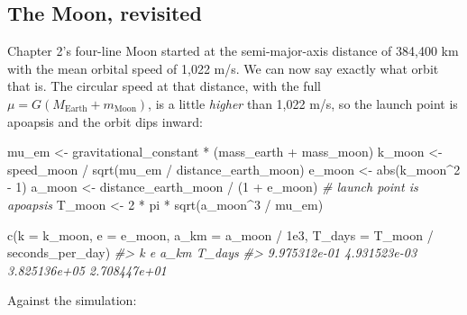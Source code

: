 \documentclass[
  10.5pt,
  letterpaper,
]{scrbook}
\newenvironment{Shaded}{\begin{snugshade}}{\end{snugshade}}
\newcommand{\AttributeTok}[1]{\textcolor[rgb]{0.00,0.00,0.00}{#1}}
\newcommand{\CommentTok}[1]{\textcolor[rgb]{0.00,0.00,0.00}{\textit{#1}}}
\newcommand{\DecValTok}[1]{\textcolor[rgb]{0.00,0.00,0.00}{#1}}
\newcommand{\FloatTok}[1]{\textcolor[rgb]{0.00,0.00,0.00}{#1}}
\newcommand{\FunctionTok}[1]{\textcolor[rgb]{0.00,0.00,0.00}{#1}}
\newcommand{\NormalTok}[1]{\textcolor[rgb]{0.00,0.00,0.00}{#1}}
\newcommand{\OtherTok}[1]{\textcolor[rgb]{0.00,0.00,0.00}{#1}}
\newcommand{\SpecialCharTok}[1]{\textcolor[rgb]{0.00,0.00,0.00}{#1}}
\theoremstyle{definition}
\theoremstyle{plain}
\theoremstyle{remark}
\begin{document}
\subsection{The Moon, revisited}\label{the-moon-revisited}

Chapter 2's four-line Moon started at the semi-major-axis distance of
384,400 km with the mean orbital speed of 1,022 m/s. We can now say
exactly what orbit that is. The circular speed at that distance, with
the full \(\mu = G(M_{\mathrm{Earth}} + m_{\mathrm{Moon}})\), is a
little \emph{higher} than 1,022 m/s, so the launch point is apoapsis and
the orbit dips inward:

\begin{Shaded}
\begin{Highlighting}[]
\NormalTok{mu\_em  }\OtherTok{\textless{}{-}}\NormalTok{ gravitational\_constant }\SpecialCharTok{*}\NormalTok{ (mass\_earth }\SpecialCharTok{+}\NormalTok{ mass\_moon)}
\NormalTok{k\_moon }\OtherTok{\textless{}{-}}\NormalTok{ speed\_moon }\SpecialCharTok{/} \FunctionTok{sqrt}\NormalTok{(mu\_em }\SpecialCharTok{/}\NormalTok{ distance\_earth\_moon)}
\NormalTok{e\_moon }\OtherTok{\textless{}{-}} \FunctionTok{abs}\NormalTok{(k\_moon}\SpecialCharTok{\^{}}\DecValTok{2} \SpecialCharTok{{-}} \DecValTok{1}\NormalTok{)}
\NormalTok{a\_moon }\OtherTok{\textless{}{-}}\NormalTok{ distance\_earth\_moon }\SpecialCharTok{/}\NormalTok{ (}\DecValTok{1} \SpecialCharTok{+}\NormalTok{ e\_moon)      }\CommentTok{\# launch point is apoapsis}
\NormalTok{T\_moon }\OtherTok{\textless{}{-}} \DecValTok{2} \SpecialCharTok{*}\NormalTok{ pi }\SpecialCharTok{*} \FunctionTok{sqrt}\NormalTok{(a\_moon}\SpecialCharTok{\^{}}\DecValTok{3} \SpecialCharTok{/}\NormalTok{ mu\_em)}

\FunctionTok{c}\NormalTok{(}\AttributeTok{k =}\NormalTok{ k\_moon, }\AttributeTok{e =}\NormalTok{ e\_moon, }\AttributeTok{a\_km =}\NormalTok{ a\_moon }\SpecialCharTok{/} \FloatTok{1e3}\NormalTok{, }\AttributeTok{T\_days =}\NormalTok{ T\_moon }\SpecialCharTok{/}\NormalTok{ seconds\_per\_day)}
\CommentTok{\#\textgreater{}            k            e         a\_km       T\_days }
\CommentTok{\#\textgreater{} 9.975312e{-}01 4.931523e{-}03 3.825136e+05 2.708447e+01}
\end{Highlighting}
\end{Shaded}

Against the simulation:
\end{document}
